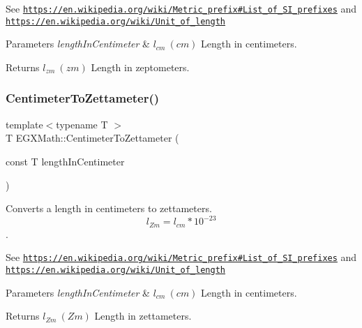 See \href{https://en.wikipedia.org/wiki/Metric_prefix#List_of_SI_prefixes}{\tt https\+://en.\+wikipedia.\+org/wiki/\+Metric\+\_\+prefix\#\+List\+\_\+of\+\_\+\+S\+I\+\_\+prefixes} and \href{https://en.wikipedia.org/wiki/Unit_of_length}{\tt https\+://en.\+wikipedia.\+org/wiki/\+Unit\+\_\+of\+\_\+length} 
\begin{DoxyParams}{Parameters}
{\em length\+In\+Centimeter} & $ l_{cm}\ (cm)$ Length in centimeters. \\
\hline
\end{DoxyParams}
\begin{DoxyReturn}{Returns}
$ l_{zm}\ (zm)$ Length in zeptometers. 
\end{DoxyReturn}
\mbox{\label{group___e_g_x_math-_conversions-_length_conversions-_s_i-_centimeter-_s_i_ga20ad80d764e7cc6f34245fe2ab4e7772}} 
\subsubsection{\texorpdfstring{Centimeter\+To\+Zettameter()}{CentimeterToZettameter()}}
{\footnotesize\ttfamily template$<$typename T $>$ \\
T E\+G\+X\+Math\+::\+Centimeter\+To\+Zettameter (\begin{DoxyParamCaption}\item[{const T}]{length\+In\+Centimeter }\end{DoxyParamCaption})}



Converts a length in centimeters to zettameters. \[ l_{Zm}=l_{cm} * 10^{-23} \]. 

See \href{https://en.wikipedia.org/wiki/Metric_prefix#List_of_SI_prefixes}{\tt https\+://en.\+wikipedia.\+org/wiki/\+Metric\+\_\+prefix\#\+List\+\_\+of\+\_\+\+S\+I\+\_\+prefixes} and \href{https://en.wikipedia.org/wiki/Unit_of_length}{\tt https\+://en.\+wikipedia.\+org/wiki/\+Unit\+\_\+of\+\_\+length} 
\begin{DoxyParams}{Parameters}
{\em length\+In\+Centimeter} & $ l_{cm}\ (cm)$ Length in centimeters. \\
\hline
\end{DoxyParams}
\begin{DoxyReturn}{Returns}
$ l_{Zm}\ (Zm)$ Length in zettameters. 
\end{DoxyReturn}
